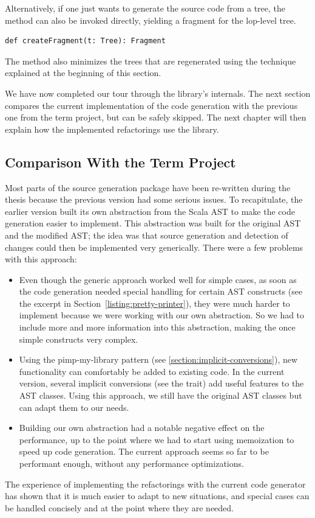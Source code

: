 Alternatively, if one just wants to generate the source code from a tree, the  method can also be invoked directly, yielding a fragment for the lop-level tree. 

\begin{lstlisting}
def createFragment(t: Tree): Fragment
\end{lstlisting}

The  method also minimizes the trees that are regenerated using the technique explained at the beginning of this section.

We have now completed our tour through the library's internals. The next section compares the current implementation of the code generation with the previous one from the term project, but can be safely skipped. The next chapter will then explain how the implemented refactorings use the library.

\subsection{Comparison With the Term Project} \label{subsection:comparison-with-the-term-project}

Most parts of the source generation package have been re-written during the thesis because the previous version had some serious issues. To recapitulate, the earlier version built its own abstraction from the Scala AST to make the code generation easier to implement. This abstraction was built for the original AST and the modified AST; the idea was that source generation and detection of changes could then be implemented very generically. There were a few problems with this approach:

\begin{itemize}
  \item Even though the generic approach worked well for simple cases, as soon as the code generation needed special handling for certain AST constructs (see the  excerpt in Section~\vref{listing:pretty-printer}), they were much harder to implement because we were working with our own abstraction. So we had to include more and more information into this abstraction, making the once simple constructs very complex.
  \item Using the pimp-my-library pattern (see \vref{section:implicit-conversions}), new functionality can comfortably be added to existing code. In the current version, several implicit conversions (see the  trait) add useful features to the AST classes. Using this approach, we still have the original AST classes but can adapt them to our needs.
  \item Building our own abstraction had a notable negative effect on the performance, up to the point where we had to start using memoization to speed up code generation. The current approach seems so far to be performant enough, without any performance optimizations.
\end{itemize}

The experience of implementing the refactorings with the current code generator has shown that it is much easier to adapt to new situations, and special cases can be handled concisely and at the point where they are needed.


